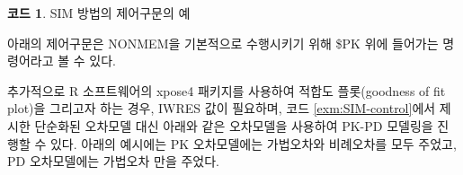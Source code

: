 \documentclass[
  10pt,
  krantz2,
  a4paper]{krantz}
\newenvironment{Shaded}{\begin{snugshade}}{\end{snugshade}}
\newcommand{\DecValTok}[1]{\textcolor[rgb]{0.00,0.00,0.81}{#1}}
\newcommand{\ErrorTok}[1]{\textcolor[rgb]{0.64,0.00,0.00}{\textbf{#1}}}
\newcommand{\KeywordTok}[1]{\textcolor[rgb]{0.13,0.29,0.53}{\textbf{#1}}}
\newcommand{\NormalTok}[1]{#1}
\newcommand{\OperatorTok}[1]{\textcolor[rgb]{0.81,0.36,0.00}{\textbf{#1}}}
\newcommand{\StringTok}[1]{\textcolor[rgb]{0.31,0.60,0.02}{#1}}
\newenvironment{Shaded}{\begin{snugshade}}{\end{snugshade}}
\theoremstyle{definition}
\theoremstyle{definition}
\newtheorem{example}{코드}[chapter]
\theoremstyle{definition}
\theoremstyle{remark}
\begin{document}
\begin{example}
\protect\hypertarget{exm:SIM-control}{}{\label{exm:SIM-control} }SIM 방법의 제어구문의 예
\end{example}

아래의 제어구문은 NONMEM을 기본적으로 수행시키기 위해 \$PK 위에 들어가는 명령어라고 볼 수 있다.

\begin{Shaded}
\end{Shaded}

추가적으로 R 소프트웨어의 xpose4 패키지를 사용하여 적합도 플롯(goodness of fit plot)을 그리고자 하는 경우, IWRES 값이 필요하며, 코드 \ref{exm:SIM-control}에서 제시한 단순화된 오차모델 대신 아래와 같은 오차모델을 사용하여 PK-PD 모델링을 진행할 수 있다. 아래의 예시에는 PK 오차모델에는 가법오차와 비례오차를 모두 주었고, PD 오차모델에는 가법오차 만을 주었다.
\end{document}
